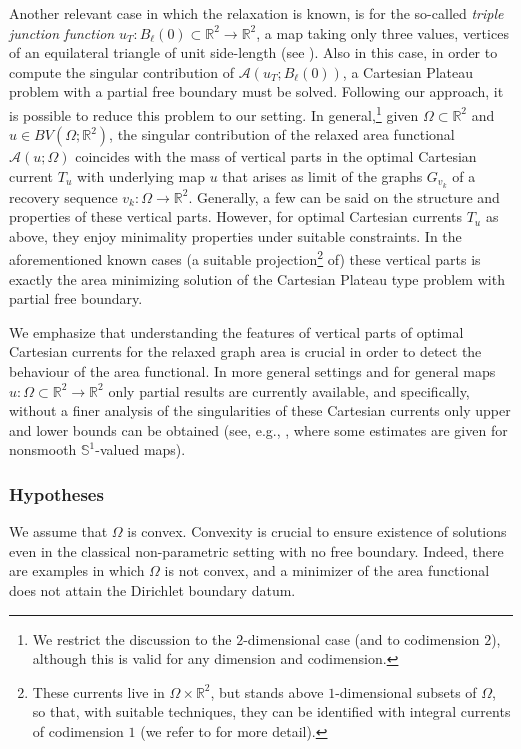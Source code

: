 \documentclass[JEP,XML,SOM,Unicode, NoFloatCountersInSection,published]{cedram}
\newcommand{\R}{\mathbb{R}}
\let\Om\Omega
\theoremstyle{definition}
\begin{document}
Another relevant case in which the relaxation
is known, is for the so-called \textit{triple junction function}
$u_T:B_\ell(0)\subset\R^2\to \R^2$, a map taking only
three values, vertices of an equilateral triangle of unit side-length (see \cite{BePa:10,Scala:19}). Also in this case,
in order to compute the singular contribution of $\mathcal A(u_T;B_\ell(0))$, a Cartesian Plateau problem with a partial free boundary must be solved. Following our approach, it is possible to reduce this problem to our setting.
In general,\footnote{We restrict the discussion to the $2$-dimensional case (and to codimension $2$), although this is valid for any dimension and codimension.} given $\Om\subset \R^2$ and $u\in BV(\Om;\R^2)$, the singular contribution of the relaxed area functional $\mathcal A(u;\Om)$ coincides with the mass of vertical parts in the optimal Cartesian current $T_u$ with underlying map $u$ that arises as limit of the graphs $G_{v_k}$ of a recovery sequence $v_k:\Om\to \R^2$. Generally, a few can be said on the structure and properties of these vertical parts. However, for optimal Cartesian currents $T_u$ as above, they enjoy minimality properties under suitable constraints. In the aforementioned known cases (a suitable projection\footnote{These currents live in $\Om\times \R^2$, but stands above $1$-dimensional subsets of $\Omega$, so that, with suitable techniques, they can be identified with integral currents of codimension $1$ (we refer to \cite{BES1,BES2,BES3,BePa:10,Scala:19} for more detail).} of) these vertical parts is exactly the area minimizing solution of the Cartesian Plateau type problem with partial free boundary.

We emphasize that understanding the features of vertical parts of optimal Cartesian currents for the relaxed graph area is crucial in order to detect the behaviour of the area functional. In more general settings and for general maps $u:\Om\subset \R^2\to \R^2$
only partial results are currently available, and specifically, without a
finer analysis of the singularities of these Cartesian currents
only upper and lower bounds can be obtained
(see, e.g., \cite{BSS,ScSc}, where some estimates are given for nonsmooth $\mathbb S^1$-valued maps).

\subsubsection*{Hypotheses} We assume that $\Om$ is convex.
Convexity is crucial to ensure existence of solutions even
in the classical non-parametric setting with no free boundary.
Indeed, there are examples in which $\Om$ is not convex, and a
minimizer of the area functional does not attain the Dirichlet boundary datum.
\end{document}
